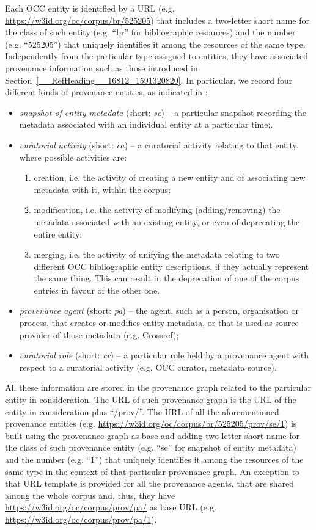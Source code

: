 \documentclass[runningheads,a4paper]{llncs}
\begin{document}
Each OCC entity is identified by a URL (e.g. \url{https://w3id.org/oc/corpus/br/525205}) that includes a two-letter short name for the class of such entity (e.g. ``br'' for bibliographic resources) and the number (e.g. ``525205'') that uniquely identifies it among the resources of the same type. Independently from the particular type assigned to entities, they have associated provenance information such as those introduced in Section~\ref{__RefHeading__16812_1591320820}. In particular, we record four different kinds of provenance entities, as indicated in  \cite{__RefNumPara__19064_1591320820}:
\begin{itemize}
\item {\em snapshot of entity metadata} (short: {\em se}) -- a particular snapshot recording the metadata associated with an individual entity at a particular time;.
\item {\em curatorial activity} (short: {\em ca}) -- a curatorial activity relating to that entity, where possible activities are:
\begin{enumerate}
\item creation, i.e. the activity of creating a new entity and of associating new metadata with it, within the corpus;
\item modification, i.e. the activity of modifying (adding/removing) the metadata associated with an existing entity, or even of deprecating the entire entity;
\item merging, i.e. the activity of unifying the metadata relating to two different OCC bibliographic entity descriptions, if they actually represent the same thing. This can result in the deprecation of one of the corpus entries in favour of the other one.
\end{enumerate}
\item {\em provenance agent} (short: {\em pa}) -- the agent, such as a person, organisation or process, that creates or modifies entity metadata, or that is used as source provider of those metadata (e.g. Crossref);
\item {\em curatorial role} (short: {\em cr}) -- a particular role held by a provenance agent with respect to a curatorial activity (e.g. OCC curator, metadata source).
\end{itemize}

All these information are stored in the provenance graph related to the particular entity in consideration. The URL of such provenance graph is the URL of the entity in consideration plus ``/prov/''. The URL of all the aforementioned provenance entities (e.g. \url{https://w3id.org/oc/corpus/br/525205/prov/se/1}) is built using the provenance graph as base and adding two-letter short name for the class of such provenance entity (e.g. ``se'' for snapshot of entity metadata) and the number (e.g. ``1'') that uniquely identifies it among the resources of the same type in the context of that particular provenance graph. An exception to that URL template is provided for all the provenance agents, that are shared among the whole corpus and, thus, they have \url{https://w3id.org/oc/corpus/prov/pa/} as base URL (e.g. \url{https://w3id.org/oc/corpus/prov/pa/1}). 
\end{document}
